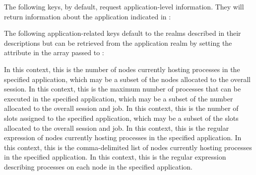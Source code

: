 The following keys, by default, request application-level information.
They will return information about the application indicated in :

%
%
%
%
%

\vspace{\baselineskip}

The following application-related keys default to the realms described in their descriptions but can be
retrieved from the application realm by setting the  attribute in the  array passed to :

In this context, this is the number of
nodes currently hosting processes in the specified application, which may be a
subset of the nodes allocated to the overall session.
\pasteAttributeItemEnd{}
%
In this context, this is the maximum number of processes that can be executed in the specified application, which may be a subset of the number allocated to the overall session and job.
\pasteAttributeItemEnd{}
%
In this context, this is the number of
slots assigned to the specified application, which may be a subset of the slots
allocated to the overall session and job.
\pasteAttributeItemEnd{}
%
In this context, this is the regular expression of nodes currently hosting processes in the specified application.
\pasteAttributeItemEnd{}
%
In this context, this is the comma-delimited list of nodes currently hosting processes in the specified application.
\pasteAttributeItemEnd{}
%
In this context, this is the regular expression describing processes on each node in the specified application.
\pasteAttributeItemEnd{}


